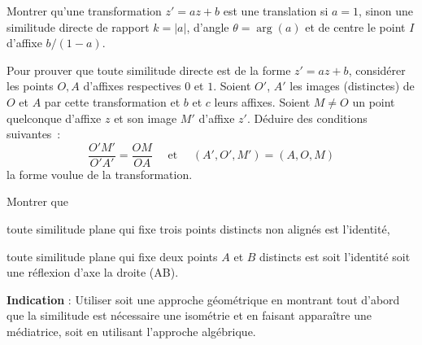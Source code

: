 \begin{exer}\label{exer:I2}
\begin{MYenumerate}
\item Montrer qu'une transformation $z'=az+b$ est une translation si $a=1$, sinon une similitude directe de rapport $k=|a|$, d'angle $\theta=\arg(a)$ et de centre le point $I$ d'affixe $b/(1-a)$. 
\item Pour prouver que toute similitude directe est de la forme $z'=az+b$, considérer les points $O, A$ d'affixes respectives $0$ et $1$. Soient $O'$, $A'$ les images (distinctes) de $O$ et $A$ par cette transformation et $b$ et $c$ leurs affixes. Soient $M \neq O$ un point quelconque d'affixe $z$ et son image $M'$ d'affixe $z'$. Déduire des conditions suivantes~:
$$\frac{O'M'}{O'A'}=\frac{OM}{OA} \quad \text{ et } \quad  (A',O',M')=(A,O,M)$$
la forme voulue de la transformation.                      
\end{MYenumerate}
\end{exer}


\begin{exer} Montrer que 
\begin{MYenumerate}
\item toute similitude plane qui fixe trois points distincts non alignés est l'identité,
\item toute similitude plane qui fixe deux points $A$ et $B$ distincts est soit l'identité soit une réflexion d'axe la droite (AB).
\end{MYenumerate}
\textbf{Indication} : Utiliser soit une approche géométrique en montrant tout d'abord que la similitude est nécessaire une isométrie et en faisant apparaître une médiatrice, soit en utilisant l'approche algébrique.
\end{exer}


